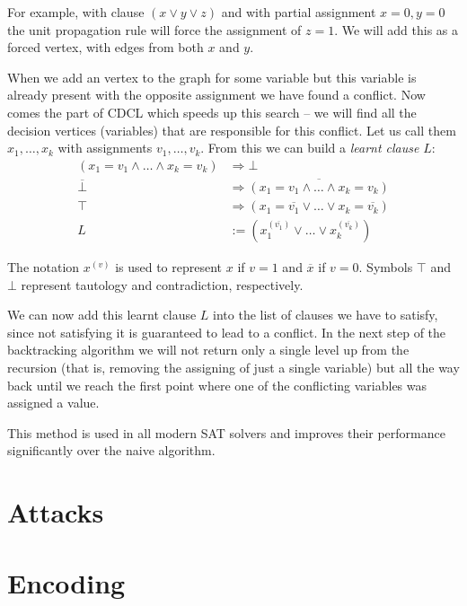 For example, with clause $(x \lor y \lor z)$ and with partial assignment $x=0, y=0$ the unit propagation rule will force the assignment of $z=1$.
We will add this as a forced vertex, with edges from both $x$ and $y$.

When we add an vertex to the graph for some variable but this variable is already present with the opposite assignment we have found a conflict.
Now comes the part of CDCL which speeds up this search -- we will find all the decision vertices (variables) that are responsible for this conflict.
Let us call them $x_1, \dots, x_k$ with assignments $v_1, \dots, v_k$.
From this we can build a \emph{learnt clause} $L$:
\begin{align*}
(x_1 = v_1 \land \dots \land x_k = v_k) &\Rightarrow \bot \\
\overline{\bot} &\Rightarrow \overline{(x_1 = v_1 \land \dots \land x_k = v_k)} \\
\top &\Rightarrow (x_1 = \overline{v_1} \lor \dots \lor x_k = \overline{v_k}) \\
L &:= (x_1^{(\overline{v_1})} \lor \dots \lor x_k^{(\overline{v_k})})
\end{align*}

The notation $x^{(v)}$ is used to represent $x$ if $v=1$ and $\overline{x}$ if $v=0$. Symbols $\top$ and $\bot$ represent tautology and contradiction, respectively.

We can now add this learnt clause $L$ into the list of clauses we have to satisfy, since not satisfying it is guaranteed to lead to a conflict.
In the next step of the backtracking algorithm we will not return only a single level up from the recursion (that is, removing the assigning of just a single variable) but all the way back until we reach the first point where one of the conflicting variables was assigned a value.

This method is used in all modern SAT solvers and improves their performance significantly over the naive algorithm.


\chapter{Attacks}


\chapter{Encoding}

